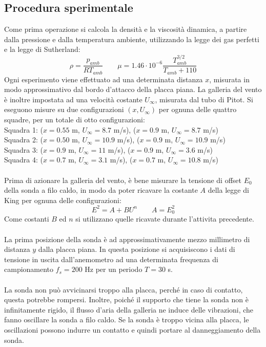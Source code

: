 \subsection{Procedura sperimentale}
Come prima operazione si calcola la densità e la viscosità dinamica, a partire dalla pressione e dalla temperatura ambiente, utilizzando la legge dei gas perfetti e la legge di Sutherland:
\begin{equation*}
    \rho = \frac{p_{amb}}{RT_{amb}} \qquad \mu = 1.46\cdot10^{-6} \frac{T_{amb}^{3/2}}{T_{amb}+110}
\end{equation*}
Ogni esperimento viene effettuato ad una determinata distanza $x$, misurata in modo approssimativo dal bordo d'attacco della placca piana. La galleria del vento è inoltre impostata ad una velocità costante $U_\infty$, misurata dal tubo di Pitot. Si eseguono misure su due configurazioni $(x,U_\infty)$ per ognuna delle quattro squadre, per un totale di otto configurazioni:\\
Squadra 1: ($x = 0.55$ m, $U_\infty= 8.7$ m/s), ($x = 0.9$ m, $U_\infty= 8.7$ m/s)\\
Squadra 2: ($x = 0.50$ m, $U_\infty= 10.9$ m/s), ($x = 0.9$ m, $U_\infty= 10.9$ m/s)\\
Squadra 3: ($x = 0.9$ m, $U_\infty= 11$ m/s), ($x = 0.9$ m, $U_\infty= 3.6$ m/s)\\
Squadra 4: ($x = 0.7$ m, $U_\infty= 3.1$ m/s), ($x = 0.7$ m, $U_\infty= 10.8$ m/s)\\\\
Prima di azionare la galleria del vento, è bene misurare la tensione di offset $E_0$ della sonda a filo caldo, in modo da poter ricavare la costante $A$ della legge di King per ognuna delle configurazioni:
\begin{equation*}
    E^2 = A + BU^n \qquad A = E_0^2
\end{equation*}
Come costanti $B$ ed $n$ si utilizzano quelle ricavate durante l'attivita precedente.\\\\
La prima posizione della sonda è ad approssimativamente mezzo millimetro di distanza $y$ dalla placca piana. In questa posizione si acquisiscono i dati di tensione in uscita dall'anemometro ad una determinata frequenza di campionamento $f_s=200$ Hz per un periodo $T=30$ s.\\\\
La sonda non può avvicinarsi troppo alla placca, perché in caso di contatto, questa potrebbe rompersi. Inoltre, poiché il supporto che tiene la sonda non è infinitamente rigido, il flusso d'aria della galleria ne induce delle vibrazioni, che fanno oscillare la sonda a filo caldo. Se la sonda è troppo vicina alla placca, le oscillazioni possono indurre un contatto e quindi portare al danneggiamento della sonda.\\\\

